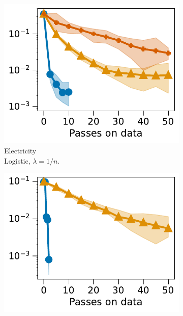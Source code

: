 \begin{figure}[t]
\begin{subfigure}{0.048\linewidth}
    \begin{minipage}{.1cm}
      \vfill
    \end{minipage}
  \end{subfigure}%
  \begin{subfigure}{0.29\linewidth}
    \centering
    \includegraphics[width=\linewidth]{plots/optimization_electricity_norm.pdf}
    \caption{Electricity\\ Logistic, $\lambda=1/n$.}
    \label{subfig:expe-logreg-constant}
  \end{subfigure}%
  \begin{subfigure}{0.29\linewidth}
    \centering
    \includegraphics[width=\linewidth]{plots/optimization_california_norm.pdf}

\end{subfigure}
\end{figure}
